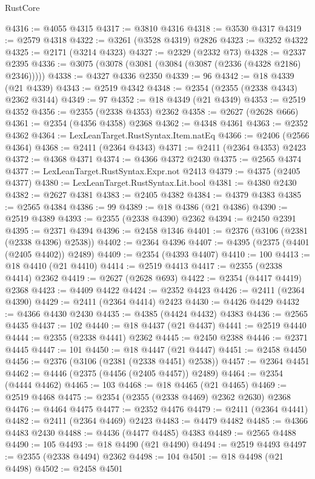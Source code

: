 \begin{lexlean}{RustCore}
\begin{coremodule}
@4316 := @4055 @4315
@4317 := @3810 @4316
@4318 := @3530 @4317
@4319 := @2579 @4318
@4322 := @3261 (@3528 @4319) @2826
@4323 := @3252 @4322
@4325 := @2171 (@3214 @4323)
@4327 := @2329 (@2332 @73)
@4328 := @2337 @2395
@4336 := @3075 (@3078 (@3081 (@3084 (@3087 (@2336 (@4328 @2186) @2346)))))
@4338 := @4327 @4336 @2350
@4339 := 96
@4342 := @18 @4339 (@21 @4339)
@4343 := @2519 @4342
@4348 := @2354 (@2355 (@2338 @4343) @2362 @3144)
@4349 := 97
@4352 := @18 @4349 (@21 @4349)
@4353 := @2519 @4352
@4356 := @2355 (@2338 @4353) @2362
@4358 := @2627 (@2628 @666)
@4361 := @2354 (@4356 @4358) @2368
@4362 := @4348 @4361
@4363 := @2352 @4362
@4364 := LexLeanTarget.RustSyntax.Item.natEq
@4366 := @2406 (@2566 @4364)
@4368 := @2411 (@2364 @4343)
@4371 := @2411 (@2364 @4353) @2423
@4372 := @4368 @4371
@4374 := @4366 @4372 @2430
@4375 := @2565 @4374
@4377 := LexLeanTarget.RustSyntax.Expr.not @2413
@4379 := @4375 (@2405 @4377)
@4380 := LexLeanTarget.RustSyntax.Lit.bool
@4381 := @4380 @2430
@4382 := @2627 @4381
@4383 := @2405 @4382
@4384 := @4379 @4383
@4385 := @2565 @4384
@4386 := 99
@4389 := @18 @4386 (@21 @4386)
@4390 := @2519 @4389
@4393 := @2355 (@2338 @4390) @2362
@4394 := @2450 @2391
@4395 := @2371 @4394
@4396 := @2458 @1346
@4401 := @2376 (@3106 (@2381 (@2338 @4396) @2538))
@4402 := @2364 @4396
@4407 := @4395 (@2375 (@4401 (@2405 @4402)) @2489)
@4409 := @2354 (@4393 @4407)
@4410 := 100
@4413 := @18 @4410 (@21 @4410)
@4414 := @2519 @4413
@4417 := @2355 (@2338 @4414) @2362
@4419 := @2627 (@2628 @693)
@4422 := @2354 (@4417 @4419) @2368
@4423 := @4409 @4422
@4424 := @2352 @4423
@4426 := @2411 (@2364 @4390)
@4429 := @2411 (@2364 @4414) @2423
@4430 := @4426 @4429
@4432 := @4366 @4430 @2430
@4435 := @4385 (@4424 @4432) @4383
@4436 := @2565 @4435
@4437 := 102
@4440 := @18 @4437 (@21 @4437)
@4441 := @2519 @4440
@4444 := @2355 (@2338 @4441) @2362
@4445 := @2450 @2388
@4446 := @2371 @4445
@4447 := 101
@4450 := @18 @4447 (@21 @4447)
@4451 := @2458 @4450
@4456 := @2376 (@3106 (@2381 (@2338 @4451) @2538))
@4457 := @2364 @4451
@4462 := @4446 (@2375 (@4456 (@2405 @4457)) @2489)
@4464 := @2354 (@4444 @4462)
@4465 := 103
@4468 := @18 @4465 (@21 @4465)
@4469 := @2519 @4468
@4475 := @2354 (@2355 (@2338 @4469) @2362 @2630) @2368
@4476 := @4464 @4475
@4477 := @2352 @4476
@4479 := @2411 (@2364 @4441)
@4482 := @2411 (@2364 @4469) @2423
@4483 := @4479 @4482
@4485 := @4366 @4483 @2430
@4488 := @4436 (@4477 @4485) @4383
@4489 := @2565 @4488
@4490 := 105
@4493 := @18 @4490 (@21 @4490)
@4494 := @2519 @4493
@4497 := @2355 (@2338 @4494) @2362
@4498 := 104
@4501 := @18 @4498 (@21 @4498)
@4502 := @2458 @4501

\end{coremodule}
\end{lexlean}
